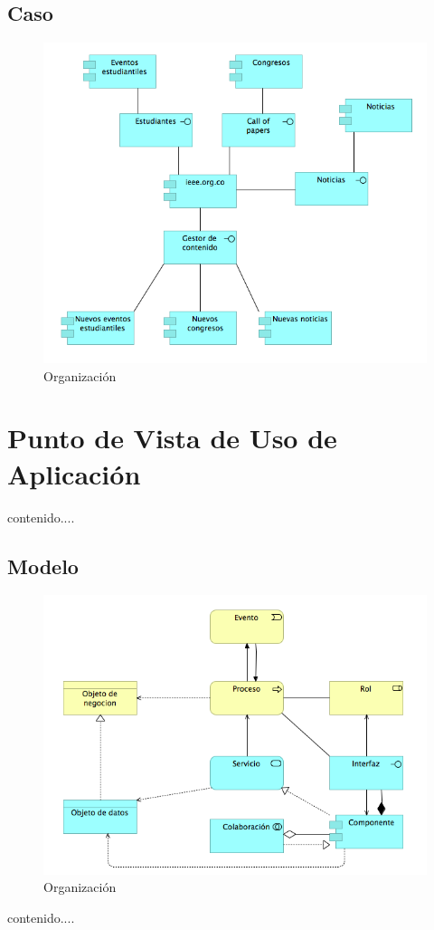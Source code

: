 \subsection{Caso}
\begin{figure}[th!]
	\centering
	\includegraphics[width=0.8\linewidth]{arquitectura_diseno/imgs/C_EstructuraAplicacion}
	\caption{Organización}
\end{figure}
\newpage
\section{Punto de Vista de Uso de Aplicación}
contenido....
\subsection{Modelo}
\begin{figure}[th!]
	\centering
	\includegraphics[width=0.8\linewidth]{arquitectura_diseno/imgs/M_UsoAplicacion}
	\caption{Organización}
\end{figure}
\newpage
contenido....

